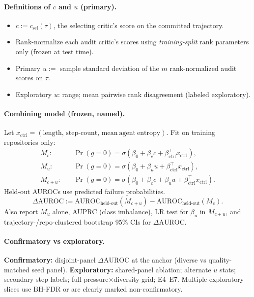 \documentclass[11pt]{article}
\newcommand{\gzero}{g{=}0}
\newcommand{\DeltaAUROC}{\Delta\mathrm{AUROC}}
\begin{document}
\paragraph{Definitions of $c$ and $u$ (primary).}
\begin{itemize}[leftmargin=*,itemsep=1pt]
  \item $c := c_{\mathrm{sel}}(\tau)$, the selecting critic's score on the committed trajectory.
  \item Rank-normalize each audit critic's scores using \emph{training-split} rank parameters only (frozen at test time).
  \item Primary $u :=$ sample standard deviation of the $m$ rank-normalized audit scores on $\tau$.
  \item Exploratory $u$: range; mean pairwise rank disagreement (labeled exploratory).
\end{itemize}

\paragraph{Combining model (frozen, named).}
Let $x_{\mathrm{ctrl}}=(\mathrm{length},\,\mathrm{step\text{-}count},\,\mathrm{mean\ agent\ entropy})$.
Fit on training repositories only:
\begin{align*}
M_{c}:&\quad \Pr(\gzero)=\sigma(\beta_0+\beta_c c+\beta_{\mathrm{ctrl}}^\top x_{\mathrm{ctrl}}),\\
M_{u}:&\quad \Pr(\gzero)=\sigma(\beta_0+\beta_u u+\beta_{\mathrm{ctrl}}^\top x_{\mathrm{ctrl}}),\\
M_{c{+}u}:&\quad \Pr(\gzero)=\sigma(\beta_0+\beta_c c+\beta_u u+\beta_{\mathrm{ctrl}}^\top x_{\mathrm{ctrl}}).
\end{align*}
Held-out AUROCs use predicted failure probabilities.
\[
\DeltaAUROC := \mathrm{AUROC}_{\mathrm{held\text{-}out}}(M_{c{+}u})-\mathrm{AUROC}_{\mathrm{held\text{-}out}}(M_{c}).
\]
Also report $M_{u}$ alone, AUPRC (class imbalance), LR test for $\beta_u$ in $M_{c{+}u}$, and trajectory-/repo-clustered bootstrap 95\% CIs for $\DeltaAUROC$.

\paragraph{Confirmatory vs exploratory.}
\textbf{Confirmatory:} disjoint-panel $\DeltaAUROC$ at the anchor (diverse vs quality-matched seed panel).
\textbf{Exploratory:} shared-panel ablation; alternate $u$ stats; secondary step labels; full pressure$\times$diversity grid; E4--E7.
Multiple exploratory slices use BH-FDR or are clearly marked non-confirmatory.
\end{document}
